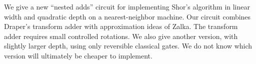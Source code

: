 \htmlonly{\FOUO}
We give a new ``nested adds'' circuit for implementing Shor's
algorithm in linear width and quadratic depth on a nearest-neighbor
machine.  Our circuit combines Draper's transform adder with
approximation ideas of Zalka.  The transform adder requires small
controlled rotations.  We also give another version, with slightly
larger depth, using only reversible classical gates.  We do not know
which version will ultimately be cheaper to implement.

